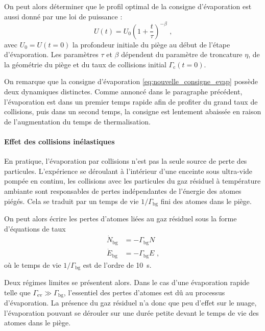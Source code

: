 On peut alors déterminer que le profil optimal de la consigne d'évaporation est aussi donné par une loi de puissance \citep{o2001scaling}:
\begin{equation}
U(t)=U_{\mathrm{0}} {\left( 1+\frac{t}{\tau}\right) }^{-\beta} \text{ ,}
\label{eq:nouvelle_consigne_evap}
\end{equation}
avec $U_{\mathrm{0}}=U(t=0)$ la profondeur initiale du piège au début de l'étape d'évaporation. Les paramètres $\tau$ et $\beta$ dépendent du paramètre de troncature $\eta$, de la géométrie du piège et du taux de collisions initial $\Gamma_{\mathrm{c}}(t=0)$.

On remarque que la consigne d'évaporation \ref{eq:nouvelle_consigne_evap} possède deux dynamiques distinctes. Comme annoncé dans le paragraphe précédent, l'évaporation est dans un premier temps rapide afin de profiter du grand taux de collisions, puis dans un second temps, la consigne est lentement abaissée en raison de l'augmentation du temps de thermalisation. 
 


\paragraph*{Effet des collisions inélastiques}
En pratique, l'évaporation par collisions n'est pas la seule source de perte des particules. L'expérience se déroulant à l'intérieur d'une enceinte sous ultra-vide pompée en continu, les collisions avec les particules du gaz résiduel à température ambiante sont responsables de pertes indépendantes de l'énergie des atomes piégés. Cela se traduit par un temps de vie $1/\Gamma_{\mathrm{bg}}$ fini des atomes dans le piège.

On peut alors écrire les pertes d'atomes liées au gaz résiduel sous la forme d'équations de taux
\begin{align}
\dot{N}_{\mathrm{bg}}&=-\Gamma_{\mathrm{bg}} N  \\
\dot{E}_{\mathrm{bg}}&=-\Gamma_{\mathrm{bg}} E \text{ ,}
\end{align}
où le temps de vie $1/\Gamma_{\mathrm{bg}}$ est de l'ordre de \SI{10}{\second}. 

Deux régimes limites se présentent alors. Dans le cas d'une évaporation rapide telle que $\Gamma_{\mathrm{ev}} \gg \Gamma_{\mathrm{bg}}$, l'essentiel des pertes d'atomes est dû au processus d'évaporation. La présence du gaz résiduel n'a donc que peu d'effet sur le nuage, l'évaporation pouvant se dérouler sur une durée petite devant le temps de vie des atomes dans le piège. 

